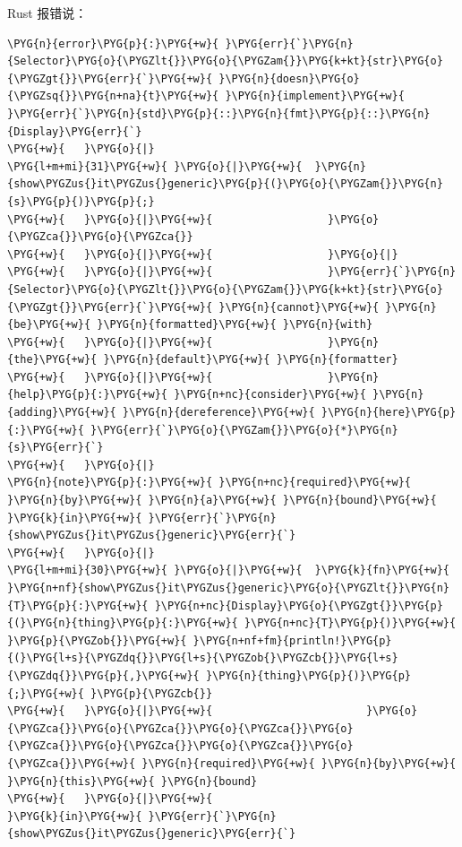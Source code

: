 Rust 报错说：

\begin{Verbatim}[commandchars=\\\{\},breaklines=true,breakanywhere=true,fontsize=\codefont,xleftmargin=17bp]
\PYG{n}{error}\PYG{p}{:}\PYG{+w}{ }\PYG{err}{`}\PYG{n}{Selector}\PYG{o}{\PYGZlt{}}\PYG{o}{\PYGZam{}}\PYG{k+kt}{str}\PYG{o}{\PYGZgt{}}\PYG{err}{`}\PYG{+w}{ }\PYG{n}{doesn}\PYG{o}{\PYGZsq{}}\PYG{n+na}{t}\PYG{+w}{ }\PYG{n}{implement}\PYG{+w}{ }\PYG{err}{`}\PYG{n}{std}\PYG{p}{::}\PYG{n}{fmt}\PYG{p}{::}\PYG{n}{Display}\PYG{err}{`}
\PYG{+w}{   }\PYG{o}{|}
\PYG{l+m+mi}{31}\PYG{+w}{ }\PYG{o}{|}\PYG{+w}{  }\PYG{n}{show\PYGZus{}it\PYGZus{}generic}\PYG{p}{(}\PYG{o}{\PYGZam{}}\PYG{n}{s}\PYG{p}{)}\PYG{p}{;}
\PYG{+w}{   }\PYG{o}{|}\PYG{+w}{                  }\PYG{o}{\PYGZca{}}\PYG{o}{\PYGZca{}}
\PYG{+w}{   }\PYG{o}{|}\PYG{+w}{                  }\PYG{o}{|}
\PYG{+w}{   }\PYG{o}{|}\PYG{+w}{                  }\PYG{err}{`}\PYG{n}{Selector}\PYG{o}{\PYGZlt{}}\PYG{o}{\PYGZam{}}\PYG{k+kt}{str}\PYG{o}{\PYGZgt{}}\PYG{err}{`}\PYG{+w}{ }\PYG{n}{cannot}\PYG{+w}{ }\PYG{n}{be}\PYG{+w}{ }\PYG{n}{formatted}\PYG{+w}{ }\PYG{n}{with}
\PYG{+w}{   }\PYG{o}{|}\PYG{+w}{                  }\PYG{n}{the}\PYG{+w}{ }\PYG{n}{default}\PYG{+w}{ }\PYG{n}{formatter}
\PYG{+w}{   }\PYG{o}{|}\PYG{+w}{                  }\PYG{n}{help}\PYG{p}{:}\PYG{+w}{ }\PYG{n+nc}{consider}\PYG{+w}{ }\PYG{n}{adding}\PYG{+w}{ }\PYG{n}{dereference}\PYG{+w}{ }\PYG{n}{here}\PYG{p}{:}\PYG{+w}{ }\PYG{err}{`}\PYG{o}{\PYGZam{}}\PYG{o}{*}\PYG{n}{s}\PYG{err}{`}
\PYG{+w}{   }\PYG{o}{|}
\PYG{n}{note}\PYG{p}{:}\PYG{+w}{ }\PYG{n+nc}{required}\PYG{+w}{ }\PYG{n}{by}\PYG{+w}{ }\PYG{n}{a}\PYG{+w}{ }\PYG{n}{bound}\PYG{+w}{ }\PYG{k}{in}\PYG{+w}{ }\PYG{err}{`}\PYG{n}{show\PYGZus{}it\PYGZus{}generic}\PYG{err}{`}
\PYG{+w}{   }\PYG{o}{|}
\PYG{l+m+mi}{30}\PYG{+w}{ }\PYG{o}{|}\PYG{+w}{  }\PYG{k}{fn}\PYG{+w}{ }\PYG{n+nf}{show\PYGZus{}it\PYGZus{}generic}\PYG{o}{\PYGZlt{}}\PYG{n}{T}\PYG{p}{:}\PYG{+w}{ }\PYG{n+nc}{Display}\PYG{o}{\PYGZgt{}}\PYG{p}{(}\PYG{n}{thing}\PYG{p}{:}\PYG{+w}{ }\PYG{n+nc}{T}\PYG{p}{)}\PYG{+w}{ }\PYG{p}{\PYGZob{}}\PYG{+w}{ }\PYG{n+nf+fm}{println!}\PYG{p}{(}\PYG{l+s}{\PYGZdq{}}\PYG{l+s}{\PYGZob{}\PYGZcb{}}\PYG{l+s}{\PYGZdq{}}\PYG{p}{,}\PYG{+w}{ }\PYG{n}{thing}\PYG{p}{)}\PYG{p}{;}\PYG{+w}{ }\PYG{p}{\PYGZcb{}}
\PYG{+w}{   }\PYG{o}{|}\PYG{+w}{                        }\PYG{o}{\PYGZca{}}\PYG{o}{\PYGZca{}}\PYG{o}{\PYGZca{}}\PYG{o}{\PYGZca{}}\PYG{o}{\PYGZca{}}\PYG{o}{\PYGZca{}}\PYG{o}{\PYGZca{}}\PYG{+w}{ }\PYG{n}{required}\PYG{+w}{ }\PYG{n}{by}\PYG{+w}{ }\PYG{n}{this}\PYG{+w}{ }\PYG{n}{bound}
\PYG{+w}{   }\PYG{o}{|}\PYG{+w}{                                }\PYG{k}{in}\PYG{+w}{ }\PYG{err}{`}\PYG{n}{show\PYGZus{}it\PYGZus{}generic}\PYG{err}{`}
\end{Verbatim}

